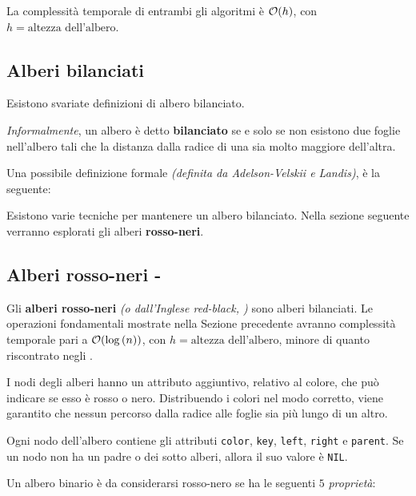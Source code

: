 \documentclass[italian, 10pt]{article}
\begin{document}
\bigskip
La complessità temporale di entrambi gli algoritmi è \(\mathcal{O}(h)\), con \(h = \text{altezza dell'albero}\).

\subsection{Alberi bilanciati}

Esistono svariate definizioni di albero bilanciato.

\textit{Informalmente}, un albero è detto \textbf{bilanciato} se e solo se non esistono due foglie nell'albero tali che la distanza dalla radice di una sia molto maggiore dell'altra.

Una possibile definizione formale \textit{(definita da Adelson-Velskii e Landis)}, è la seguente:


Esistono varie tecniche per mantenere un albero bilanciato.
Nella sezione seguente verranno esplorati gli alberi \textbf{rosso-neri}.

\subsection{Alberi rosso-neri - \RB}
\label{sec:alberi-rosso-neri}

Gli \textbf{alberi rosso-neri} \textit{(o dall'Inglese red-black, \RB)} sono alberi bilanciati.
Le operazioni fondamentali mostrate nella Sezione precedente avranno complessità temporale pari a \(\mathcal{O}(\log{(n)})\), con \(h = \text{altezza dell'albero}\), minore di quanto riscontrato negli \BST.

I nodi degli alberi \RB hanno un attributo aggiuntivo, relativo al colore, che può indicare se esso è rosso o nero.
Distribuendo i colori nel modo corretto, viene garantito che nessun percorso dalla radice alle foglie sia più lungo di un altro.

Ogni nodo dell'albero contiene gli attributi \texttt{color}, \texttt{key}, \texttt{left}, \texttt{right} e \texttt{parent}.
Se un nodo non ha un padre o dei sotto alberi, allora il suo valore è \texttt{NIL}.

Un albero binario è da considerarsi rosso-nero se ha le seguenti \(5\) \textit{proprietà}:
\end{document}

